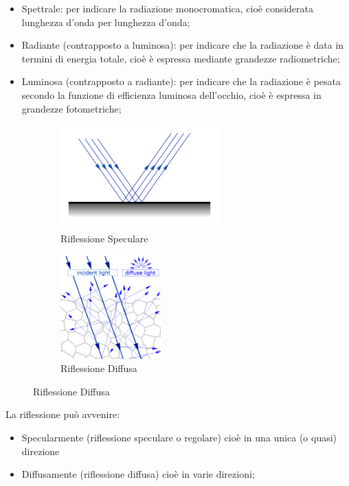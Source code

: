 \begin{itemize}

\item Spettrale: per indicare la radiazione monocromatica, cioè considerata
lunghezza d'onda per lunghezza d'onda; 

\item Radiante (contrapposto a luminosa): per indicare che la radiazione è
data in termini di energia totale, cioè è espressa mediante grandezze
radiometriche;

\item Luminosa (contrapposto a radiante): per indicare che la radiazione è
pesata secondo la funzione di efficienza luminosa dell'occhio, cioè è espressa
in grandezze fotometriche; 

\end{itemize}
\begin{figure}[!bh]
\begin{subfigure}[b]{.5\textwidth}
\centering
\includegraphics[height=4cm]{img/riflessione.png}
\caption{Riflessione Speculare}\label{fig:riflessione1}
\end{subfigure}
\begin{subfigure}[b]{.5\textwidth}
\centering
\includegraphics[height=4cm]{img/riflessione_diffusa.png}
\caption{Riflessione Diffusa}\label{fig:riflessione2}
\end{subfigure}
\end{figure}
La riflessione può avvenire:
\begin{itemize}
\item Specularmente (riflessione speculare o regolare) cioè in una unica (o quasi) direzione
\item Diffusamente (riflessione diffusa) cioè in varie direzioni;
\end{itemize}
